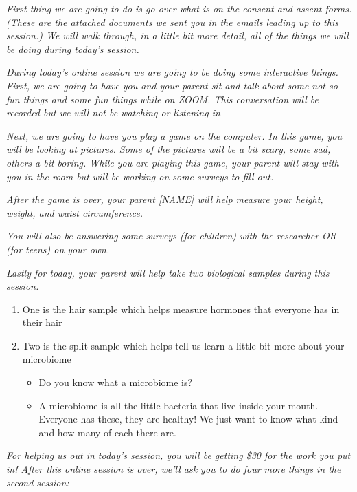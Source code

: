 \documentclass[]{book}
\begin{document}
\emph{First thing we are going to do is go over what is on the consent and assent forms. (These are the attached documents we sent you in the emails leading up to this session.) We will walk through, in a little bit more detail, all of the things we will be doing during today's session.}

\emph{During today's online session we are going to be doing some interactive things. First, we are going to have you and your parent sit and talk about some not so fun things and some fun things while on ZOOM. This conversation will be recorded but we will not be watching or listening in}

\emph{Next, we are going to have you play a game on the computer. In this game, you will be looking at pictures. Some of the pictures will be a bit scary, some sad, others a bit boring. While you are playing this game, your parent will stay with you in the room but will be working on some surveys to fill out.}

\emph{After the game is over, your parent {[}NAME{]} will help measure your height, weight, and waist circumference.}

\emph{You will also be answering some surveys (for children) with the researcher OR (for teens) on your own.}

\emph{Lastly for today, your parent will help take two biological samples during this session.}

\begin{enumerate}
\def\labelenumi{\arabic{enumi}.}
\item
  One is the hair sample which helps measure hormones that everyone has in their hair
\item
  Two is the split sample which helps tell us learn a little bit more about your microbiome

  \begin{itemize}
  \item
    Do you know what a microbiome is?
  \item
    A microbiome is all the little bacteria that live inside your mouth. Everyone has these, they are healthy! We just want to know what kind and how many of each there are.
  \end{itemize}
\end{enumerate}

\emph{For helping us out in today's session, you will be getting \$30 for the work you put in! After this online session is over, we'll ask you to do four more things in the second session:}
\end{document}
